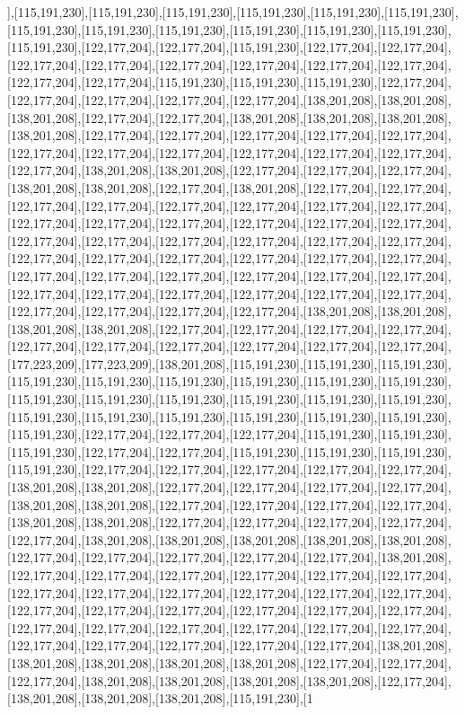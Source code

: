 ],[115,191,230],[115,191,230],[115,191,230],[115,191,230],[115,191,230],[115,191,230],[115,191,230],[115,191,230],[115,191,230],[115,191,230],[115,191,230],[115,191,230],[115,191,230],[122,177,204],[122,177,204],[115,191,230],[122,177,204],[122,177,204],[122,177,204],[122,177,204],[122,177,204],[122,177,204],[122,177,204],[122,177,204],[122,177,204],[122,177,204],[115,191,230],[115,191,230],[115,191,230],[122,177,204],[122,177,204],[122,177,204],[122,177,204],[122,177,204],[138,201,208],[138,201,208],[138,201,208],[122,177,204],[122,177,204],[138,201,208],[138,201,208],[138,201,208],[138,201,208],[122,177,204],[122,177,204],[122,177,204],[122,177,204],[122,177,204],[122,177,204],[122,177,204],[122,177,204],[122,177,204],[122,177,204],[122,177,204],[122,177,204],[138,201,208],[138,201,208],[122,177,204],[122,177,204],[122,177,204],[138,201,208],[138,201,208],[122,177,204],[138,201,208],[122,177,204],[122,177,204],[122,177,204],[122,177,204],[122,177,204],[122,177,204],[122,177,204],[122,177,204],[122,177,204],[122,177,204],[122,177,204],[122,177,204],[122,177,204],[122,177,204],[122,177,204],[122,177,204],[122,177,204],[122,177,204],[122,177,204],[122,177,204],[122,177,204],[122,177,204],[122,177,204],[122,177,204],[122,177,204],[122,177,204],[122,177,204],[122,177,204],[122,177,204],[122,177,204],[122,177,204],[122,177,204],[122,177,204],[122,177,204],[122,177,204],[122,177,204],[122,177,204],[122,177,204],[122,177,204],[122,177,204],[122,177,204],[122,177,204],[138,201,208],[138,201,208],[138,201,208],[138,201,208],[122,177,204],[122,177,204],[122,177,204],[122,177,204],[122,177,204],[122,177,204],[122,177,204],[122,177,204],[122,177,204],[122,177,204],[177,223,209],[177,223,209],[138,201,208],[115,191,230],[115,191,230],[115,191,230],[115,191,230],[115,191,230],[115,191,230],[115,191,230],[115,191,230],[115,191,230],[115,191,230],[115,191,230],[115,191,230],[115,191,230],[115,191,230],[115,191,230],[115,191,230],[115,191,230],[115,191,230],[115,191,230],[115,191,230],[115,191,230],[115,191,230],[122,177,204],[122,177,204],[122,177,204],[115,191,230],[115,191,230],[115,191,230],[122,177,204],[122,177,204],[115,191,230],[115,191,230],[115,191,230],[115,191,230],[122,177,204],[122,177,204],[122,177,204],[122,177,204],[122,177,204],[138,201,208],[138,201,208],[122,177,204],[122,177,204],[122,177,204],[122,177,204],[138,201,208],[138,201,208],[122,177,204],[122,177,204],[122,177,204],[122,177,204],[138,201,208],[138,201,208],[122,177,204],[122,177,204],[122,177,204],[122,177,204],[122,177,204],[138,201,208],[138,201,208],[138,201,208],[138,201,208],[138,201,208],[122,177,204],[122,177,204],[122,177,204],[122,177,204],[122,177,204],[138,201,208],[122,177,204],[122,177,204],[122,177,204],[122,177,204],[122,177,204],[122,177,204],[122,177,204],[122,177,204],[122,177,204],[122,177,204],[122,177,204],[122,177,204],[122,177,204],[122,177,204],[122,177,204],[122,177,204],[122,177,204],[122,177,204],[122,177,204],[122,177,204],[122,177,204],[122,177,204],[122,177,204],[122,177,204],[122,177,204],[122,177,204],[122,177,204],[122,177,204],[122,177,204],[138,201,208],[138,201,208],[138,201,208],[138,201,208],[138,201,208],[122,177,204],[122,177,204],[122,177,204],[138,201,208],[138,201,208],[138,201,208],[138,201,208],[122,177,204],[138,201,208],[138,201,208],[138,201,208],[115,191,230],[1